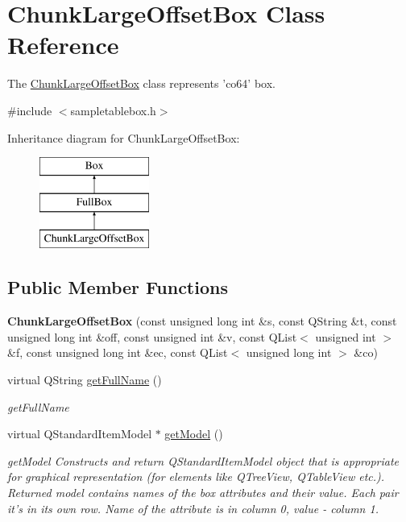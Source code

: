 \hypertarget{class_chunk_large_offset_box}{\section{Chunk\-Large\-Offset\-Box Class Reference}
\label{class_chunk_large_offset_box}
}


The \hyperlink{class_chunk_large_offset_box}{Chunk\-Large\-Offset\-Box} class represents 'co64' box.  




{\ttfamily \#include $<$sampletablebox.\-h$>$}

Inheritance diagram for Chunk\-Large\-Offset\-Box\-:\begin{figure}[H]
\begin{center}
\leavevmode
\includegraphics[height=3.000000cm]{class_chunk_large_offset_box}
\end{center}
\end{figure}
\subsection*{Public Member Functions}
\begin{DoxyCompactItemize}
\item 
\hypertarget{class_chunk_large_offset_box_a4a869d64fbe3724f31fdb2e7439488ff}{{\bfseries Chunk\-Large\-Offset\-Box} (const unsigned long int \&s, const Q\-String \&t, const unsigned long int \&off, const unsigned int \&v, const Q\-List$<$ unsigned int $>$ \&f, const unsigned long int \&ec, const Q\-List$<$ unsigned long int $>$ \&co)}\label{class_chunk_large_offset_box_a4a869d64fbe3724f31fdb2e7439488ff}

\item 
virtual Q\-String \hyperlink{class_chunk_large_offset_box_acdadc159668e5e6ab286dbb840877f31}{get\-Full\-Name} ()
\begin{DoxyCompactList}\small\item\em get\-Full\-Name \end{DoxyCompactList}\item 
virtual Q\-Standard\-Item\-Model $\ast$ \hyperlink{class_chunk_large_offset_box_a16b02676650f3c08360bad4ac35470aa}{get\-Model} ()
\begin{DoxyCompactList}\small\item\em get\-Model Constructs and return Q\-Standard\-Item\-Model object that is appropriate for graphical representation (for elements like Q\-Tree\-View, Q\-Table\-View etc.). Returned model contains names of the box attributes and their value. Each pair it's in its own row. Name of the attribute is in column 0, value -\/ column 1. \end{DoxyCompactList}\end{DoxyCompactItemize}
